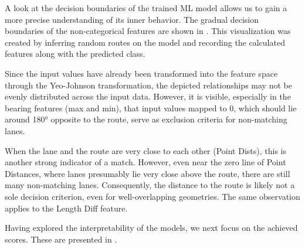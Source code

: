 A look at the decision boundaries of the trained ML model allows us to gain a more precise understanding of its inner behavior. The gradual decision boundaries of the non-categorical features are shown in . This visualization was created by inferring random routes on the model and recording the calculated features along with the predicted class. 

Since the input values have already been transformed into the feature space through the Yeo-Johnson transformation, the depicted relationships may not be evenly distributed across the input data. However, it is visible, especially in the bearing features (max and min), that input values mapped to 0, which should lie around 180° opposite to the route, serve as exclusion criteria for non-matching lanes.

When the lane and the route are very close to each other (Point Dists), this is another strong indicator of a match. However, even near the zero line of Point Distances, where lanes presumably lie very close above the route, there are still many non-matching lanes. Consequently, the distance to the route is likely not a sole decision criterion, even for well-overlapping geometries. The same observation applies to the Length Diff feature.

Having explored the interpretability of the models, we next focus on the achieved scores. These are presented in .

\begin{table}[ht]
\caption{Final model scores calculated on the OSM 2022 and OSM 2023 ground truth datasets. Highlighted are also the results of cross-validation on unseen data.}
\label{tab:model-scores}
\end{table}

